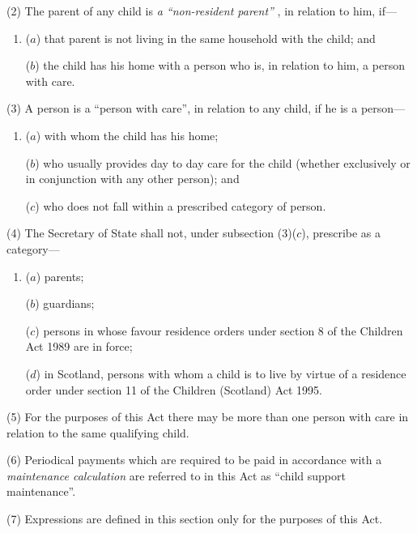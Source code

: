 \documentclass[12pt,a4paper]{article}
\begin{document}
(2) The parent of any child is 
\emph{a ``non-resident parent''}%
, in relation to him, if—
\begin{enumerate}\item[]
($a$) that parent is not living in the same household with the child; and

($b$) the child has his home with a person who is, in relation to him, a person with care.
\end{enumerate}

(3) A person is a “person with care”, in relation to any child, if he is a person—
\begin{enumerate}\item[]
($a$) with whom the child has his home;

($b$) who usually provides day to day care for the child (whether exclusively or in conjunction with any other person); and

($c$) who does not fall within a prescribed category of person.
\end{enumerate}

(4) The Secretary of State shall not, under subsection (3)($c$), prescribe as a category—
\begin{enumerate}\item[]
($a$) parents;

($b$) guardians;

($c$) persons in whose favour residence orders under section 8 of the Children Act 1989 are in force;

($d$) in Scotland, persons 
with whom a child is to live by virtue of a residence order under section 11 of the Children (Scotland) Act 1995.  %
\end{enumerate}

(5) For the purposes of this Act there may be more than one person with care in relation to the same qualifying child.

(6) Periodical payments which are required to be paid in accordance with a 
\emph{maintenance calculation}  %
are referred to in this Act as “child support maintenance”.

(7) Expressions are defined in this section only for the purposes of this Act.

\end{document}
